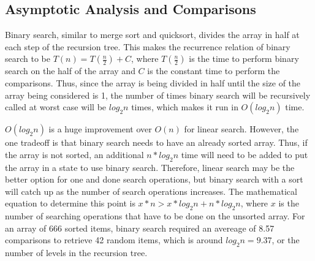 \documentclass[letterpaper, 10pt,DIV=13]{scrartcl}
\numberwithin{equation}{section} %
\numberwithin{figure}{section} %
\numberwithin{table}{section} %
\begin{document}
\subsection{Asymptotic Analysis and Comparisons}
Binary search, similar to merge sort and quicksort, divides the array in half at each step of the recursion tree. This makes the recurrence relation of binary search to be $T(n) = T(\frac{n}{2}) + C$, where $T(\frac{n}{2})$ is the time to perform binary search on the half of the array and $C$ is the constant time to perform the comparisons. Thus, since the array is being divided in half until the size of the array being considered is 1, the number of times binary search will be recursively called at worst case will be $log_2n$ times, which makes it run in $O(log_2n)$ time.

$O(log_2n)$ is a huge improvement over $O(n)$ for linear search. However, the one tradeoff is that binary search needs to have an already sorted array. Thus, if the array is not sorted, an additional $n * log_2n$ time will need to be added to put the array in a state to use binary search. Therefore, linear search may be the better option for one and done search operations, but binary search with a sort will catch up as the number of search operations increases. The mathematical equation to determine this point is $x * n > x * log_2n + n * log_2n$, where $x$ is the number of searching operations that have to be done on the unsorted array. For an array of 666 sorted items, binary search required an avereage of 8.57 comparisons to retrieve 42 random items, which is around $log_2n = 9.37$, or the number of levels in the recursion tree.
\end{document}
